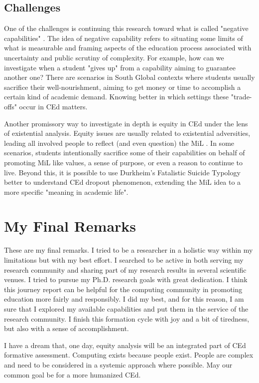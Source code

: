         

\subsection{Challenges}

 One of the challenges is continuing this research toward what is called "negative capabilities" \cite{unterhalter:2020}. The idea of negative capability refers to situating some limits of what is measurable and framing aspects of the education process associated with uncertainty and public scrutiny of complexity. For example, how can we investigate when a student "gives up" from a capability aiming to guarantee another one? There are scenarios in South Global contexts where students usually sacrifice their well-nourishment, aiming to get money or time to accomplish a certain kind of academic demand. Knowing better in which settings these "trade-offs" occur in \gls{CEd} matters.

 Another promissory way to investigate in depth is equity in \gls{CEd} under the lens of existential analysis. Equity issues are usually related to existential adversities, leading all involved people to reflect (and even question) the \gls{MiL} \cite{manco:2021}. In some scenarios, students intentionally sacrifice some of their capabilities on behalf of promoting \gls{MiL} like values, a sense of purpose, or even a reason to continue to live. Beyond this, it is possible to use Durkheim's Fatalistic Suicide Typology \cite{godor:2017} better to understand \gls{CEd} dropout phenomenon, extending the \gls{MiL} idea to a more specific "meaning in academic life".

 \section{My Final Remarks}
 \label{conclusions-sec:my-final-remarks}

 These are my final remarks. I tried to be a researcher in a holistic way within my limitations but with my best effort. I searched to be active in both serving my research community and sharing part of my research results in several scientific venues. I tried to pursue my \gls{Ph.D.} research goals with great dedication. I think this journey report can be helpful for the computing community in promoting education more fairly and responsibly. I did my best, and for this reason, I am sure that I explored my available capabilities and put them in the service of the research community. I finish this formation cycle with joy and a bit of tiredness, but also with a sense of accomplishment.

  I have a dream that, one day, equity analysis will be an integrated part of \gls{CEd} formative assessment. Computing exists because people exist. People are complex and need to be considered in a systemic approach where possible. May our common goal be for a more humanized \gls{CEd}.


